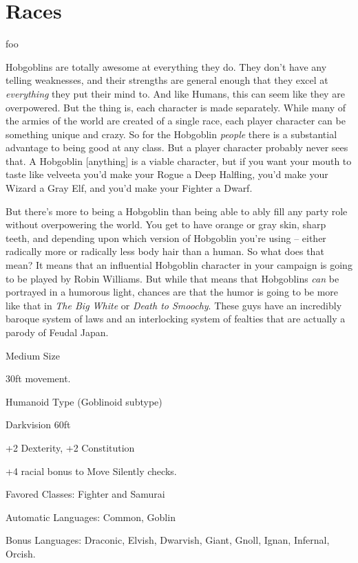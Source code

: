 \chapter{Races}

foo


Hobgoblins are totally awesome at everything they do. They don't have any telling weaknesses, and their strengths are general enough that they excel at \textit{everything} they put their mind to. And like Humans, this can seem like they are overpowered. But the thing is, each character is made separately. While many of the armies of the world are created of a single race, each player character can be something unique and crazy. So for the Hobgoblin \textit{people} there is a substantial advantage to being good at any class. But a player character probably never sees that. A Hobgoblin [anything] is a viable character, but if you want your mouth to taste like velveeta you'd make your Rogue a Deep Halfling, you'd make your Wizard a Gray Elf, and you'd make your Fighter a Dwarf.

But there's more to being a Hobgoblin than being able to ably fill any party role without overpowering the world. You get to have orange or gray skin, sharp teeth, and depending upon which version of Hobgoblin you're using -- either radically more or radically less body hair than a human. So what does that mean? It means that an influential Hobgoblin character in your campaign is going to be played by Robin Williams. But while that means that Hobgoblins \textit{can} be portrayed in a humorous light, chances are that the humor is going to be more like that in \emph{The Big White} or \emph{Death to Smoochy}. These guys have an incredibly baroque system of laws and an interlocking system of fealties that are actually 
a parody of Feudal Japan. 

\begin{itemize*}
\item Medium Size
\item 30ft movement.
\item Humanoid Type (Goblinoid subtype)
\item Darkvision 60ft
\item +2 Dexterity, +2 Constitution
\item +4 racial bonus to Move Silently checks.
\item Favored Classes: Fighter and Samurai
\item Automatic Languages: Common, Goblin
\item Bonus Languages: Draconic, Elvish, Dwarvish, Giant, Gnoll, Ignan, Infernal, Orcish. 
\end{itemize*}
